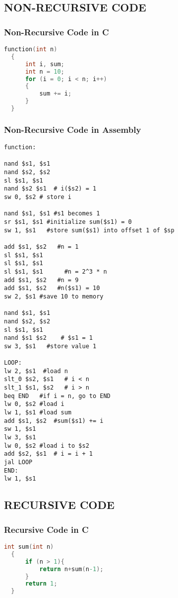 \documentclass[11pt, titlepage]{article}
\begin{document}
\subsection{NON-RECURSIVE CODE}
\subsubsection{Non-Recursive Code in C}
\begin{lstlisting}[language = C]
function(int n)
  {
      int i, sum;
      int n = 10;
      for (i = 0; i < n; i++)
      {
          sum += i;
      }
  }
\end{lstlisting}
\subsubsection{Non-Recursive Code in Assembly}
\begin{lstlisting}[language=Ant]
function:

nand $s1, $s1
nand $s2, $s2  
sl $s1, $s1
nand $s2 $s1  # i($s2) = 1 
sw 0, $s2 # store i

nand $s1, $s1 #s1 becomes 1
sr $s1, $s1 #initialize sum($s1) = 0
sw 1, $s1   #store sum($s1) into offset 1 of $sp

add $s1, $s2   #n = 1
sl $s1, $s1
sl $s1, $s1
sl $s1, $s1      #n = 2^3 * n 
add $s1, $s2   #n = 9
add $s1, $s2   #n($s1) = 10
sw 2, $s1 #save 10 to memory

nand $s1, $s1
nand $s2, $s2  
sl $s1, $s1
nand $s1 $s2    # $s1 = 1   
sw 3, $s1   #store value 1

LOOP:
lw 2, $s1  #load n  
slt_0 $s2, $s1   # i < n
slt_1 $s1, $s2   # i > n
beq END   #if i = n, go to END
lw 0, $s2 #load i
lw 1, $s1 #load sum
add $s1, $s2  #sum($s1) += i
sw 1, $s1
lw 3, $s1
lw 0, $s2 #load i to $s2
add $s2, $s1  # i = i + 1
jal LOOP
END:
lw 1, $s1

\end{lstlisting}

\subsection{RECURSIVE CODE}
\subsubsection{Recursive Code in C}
\begin{lstlisting}[language = C]
int sum(int n)
  {
      if (n > 1){
          return n+sum(n-1);
      }
      return 1;
  }
\end{lstlisting}
\end{document}
